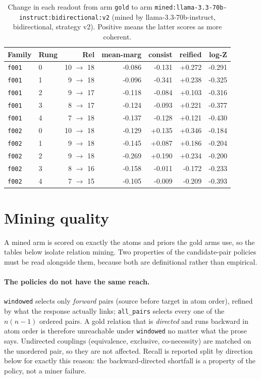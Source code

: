 \documentclass[11pt]{article}
\begin{document}
\begin{table}[htbp]
\centering
\small
\caption{Change in each readout from arm \texttt{gold} to arm \texttt{mined:llama-3.3-70b-instruct:bidirectional:v2} (mined by llama-3.3-70b-instruct, bidirectional, strategy v2). Positive means the latter scores as more coherent.}
\label{tab:arm-delta-gold-mined-llama-3-3-70b-instruct-bidirectional-v2}
\begin{tabular}{llrrrrr}
\toprule
Family & Rung & Rel & \textbf{mean-marg} & \textbf{consist} & \textbf{reified} & \textbf{log-Z} \\
\midrule
\texttt{f001} & 0 & 10 $\to$ 18 & -0.086 & -0.131 & +0.272 & -0.291 \\
\texttt{f001} & 1 & 9 $\to$ 18 & -0.096 & -0.341 & +0.238 & -0.325 \\
\texttt{f001} & 2 & 9 $\to$ 17 & -0.118 & -0.084 & +0.103 & -0.316 \\
\texttt{f001} & 3 & 8 $\to$ 17 & -0.124 & -0.093 & +0.221 & -0.377 \\
\texttt{f001} & 4 & 7 $\to$ 18 & -0.137 & -0.128 & +0.121 & -0.430 \\
\texttt{f002} & 0 & 10 $\to$ 18 & -0.129 & +0.135 & +0.346 & -0.184 \\
\texttt{f002} & 1 & 9 $\to$ 18 & -0.145 & +0.087 & +0.186 & -0.204 \\
\texttt{f002} & 2 & 9 $\to$ 18 & -0.269 & +0.190 & +0.234 & -0.200 \\
\texttt{f002} & 3 & 8 $\to$ 16 & -0.158 & -0.011 & -0.172 & -0.233 \\
\texttt{f002} & 4 & 7 $\to$ 15 & -0.105 & -0.009 & -0.209 & -0.393 \\
\bottomrule
\end{tabular}
\end{table}

\section{Mining quality}\label{sec:mining}

A mined arm is scored on exactly the atoms and priors the gold arms use, so the tables below isolate relation mining. Two properties of the candidate-pair policies must be read alongside them, because both are definitional rather than empirical.

\paragraph{The policies do not have the same reach.} \texttt{windowed} selects only \emph{forward} pairs (source before target in atom order), refined by what the response actually links; \texttt{all\_pairs} selects every one of the $n(n-1)$ ordered pairs. A gold relation that is \emph{directed} and runs backward in atom order is therefore unreachable under \texttt{windowed} no matter what the prose says. Undirected couplings (equivalence, exclusive, co-necessity) are matched on the unordered pair, so they are not affected. Recall is reported split by direction below for exactly this reason: the backward-directed shortfall is a property of the policy, not a miner failure.
\end{document}
